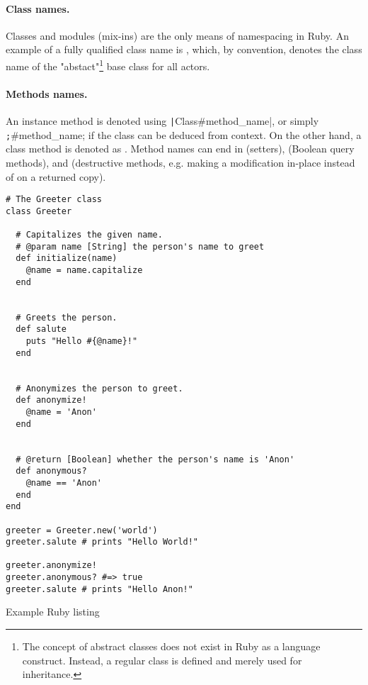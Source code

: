 \paragraph*{Class names.} Classes and modules (mix-ins) are the only means of
namespacing in Ruby. An example of a fully qualified class name is ,
which, by convention, denotes the class name of the "abstact"\footnote{The concept of abstract classes
does not exist in Ruby as a language construct. Instead, a regular class is defined and merely used
for inheritance.} base class for all actors.

\paragraph*{Methods names.} An
instance method is denoted using \texttt|Class#method_name|, or simply
\texttt;#method_name; if the class
can be deduced from context. On the other hand, a class method is denoted as
. Method names can end in \sh{=} (setters), 
(Boolean query methods), and \sh{!} (destructive methods, e.g. making a
modification in-place instead of on a returned copy).


\begin{listing}
	\begin{verbatim}
# The Greeter class
class Greeter

  # Capitalizes the given name.
  # @param name [String] the person's name to greet
  def initialize(name)
    @name = name.capitalize
  end


  # Greets the person.
  def salute
    puts "Hello #{@name}!"
  end


  # Anonymizes the person to greet.
  def anonymize!
    @name = 'Anon'
  end


  # @return [Boolean] whether the person's name is 'Anon'
  def anonymous?
    @name == 'Anon'
  end
end

greeter = Greeter.new('world')
greeter.salute # prints "Hello World!"

greeter.anonymize!
greeter.anonymous? #=> true
greeter.salute # prints "Hello Anon!"
	\end{verbatim}
	\caption{Example Ruby listing}
	\label{lst:ruby:example}
\end{listing}

